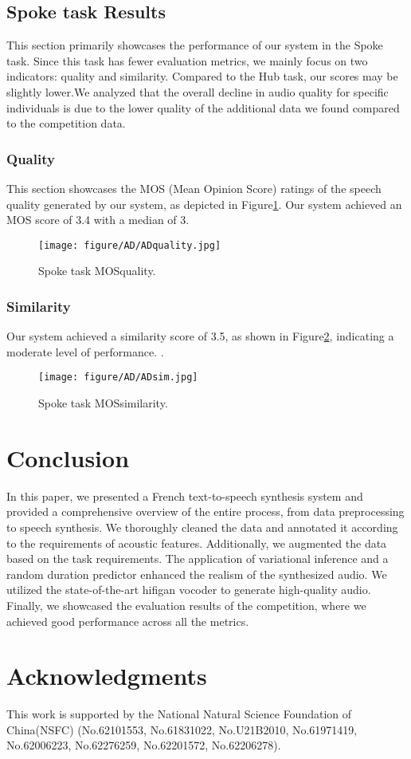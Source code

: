 \documentclass{INTERSPEECH2023}
\begin{document}
\subsection{Spoke task Results}
This section primarily showcases the performance of our system in the Spoke task. Since this task has fewer evaluation metrics, we mainly focus on two indicators: quality and similarity. Compared to the Hub task, our scores may be slightly lower.We analyzed that the overall decline in audio quality for specific individuals is due to the lower quality of the additional data we found compared to the competition data.

\subsubsection{Quality}
This section showcases the MOS (Mean Opinion Score) ratings of the speech quality generated by our system, as depicted in Figure\ref{AD_quality}. Our system achieved an MOS score of 3.4 with a median of 3.

\begin{figure}[h]
  \centering
  \texttt{[image: figure/AD/ADquality.jpg]}
  \caption{Spoke task MOSquality.}
  \label{AD_quality}
\end{figure}

\subsubsection{Similarity}
Our system achieved a similarity score of 3.5, as shown in Figure\ref{AD_Similarity}, indicating a moderate level of performance. .

\begin{figure}[h]
  \centering
  \texttt{[image: figure/AD/ADsim.jpg]}
  \caption{Spoke task MOSsimilarity.}
  \label{AD_Similarity}
\end{figure}

\section{Conclusion}
In this paper, we presented a French text-to-speech synthesis system and provided a comprehensive overview of the entire process, from data preprocessing to speech synthesis. We thoroughly cleaned the data and annotated it according to the requirements of acoustic features. Additionally, we augmented the data based on the task requirements. The application of variational inference and a random duration predictor enhanced the realism of the synthesized audio. We utilized the state-of-the-art hifigan vocoder to generate high-quality audio. Finally, we showcased the evaluation results of the competition, where we achieved good performance across all the metrics.

\section{Acknowledgments}

This work is supported by the National Natural Science Foundation of China(NSFC)
(No.62101553, No.61831022, No.U21B2010, No.61971419,
No.62006223, No.62276259, No.62201572, No.62206278).



\end{document}
